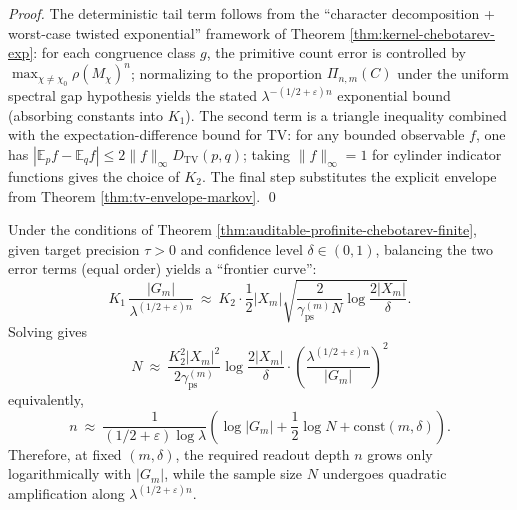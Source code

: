 \begin{proof}
The deterministic tail term follows from the ``character decomposition + worst-case twisted exponential'' framework of Theorem \ref{thm:kernel-chebotarev-exp}: for each congruence class \(g\), the primitive count error is controlled by \(\max_{\chi\ne\chi_0}\rho(M_\chi)^n\); normalizing to the proportion \(\Pi_{n,m}(C)\) under the uniform spectral gap hypothesis yields the stated \(\lambda^{-(1/2+\varepsilon)n}\) exponential bound (absorbing constants into \(K_1\)).
The second term is a triangle inequality combined with the expectation-difference bound for TV: for any bounded observable \(f\), one has \(|\mathbb{E}_p f-\mathbb{E}_q f|\le 2\|f\|_\infty D_{\mathrm{TV}}(p,q)\); taking \(\|f\|_\infty=1\) for cylinder indicator functions gives the choice of \(K_2\).
The final step substitutes the explicit envelope from Theorem \ref{thm:tv-envelope-markov}. \qed
\end{proof}

\begin{corollary}\label{cor:auditable-profinite-chebotarev-tradeoff}
Under the conditions of Theorem \ref{thm:auditable-profinite-chebotarev-finite}, given target precision \(\tau>0\) and confidence level \(\delta\in(0,1)\), balancing the two error terms (equal order) yields a ``frontier curve'':
\[
K_1\,\frac{|G_m|}{\lambda^{(1/2+\varepsilon)n}}
\ \approx\
K_2\cdot \frac12|X_m|\sqrt{\frac{2}{\gamma_{\mathrm{ps}}^{(m)}N}\log\frac{2|X_m|}{\delta}}.
\]
Solving gives
\[
\boxed{\;
N\ \approx\
\frac{K_2^2|X_m|^2}{2\gamma_{\mathrm{ps}}^{(m)}}\log\frac{2|X_m|}{\delta}\cdot
\left(\frac{\lambda^{(1/2+\varepsilon)n}}{|G_m|}\right)^2
\;}
\]
equivalently,
\[
\boxed{\;
n\ \approx\
\frac{1}{(1/2+\varepsilon)\log\lambda}\left(\log|G_m|+\frac12\log N+\mathrm{const}(m,\delta)\right).
\;}
\]
Therefore, at fixed \((m,\delta)\), the required readout depth \(n\) grows only logarithmically with \(|G_m|\), while the sample size \(N\) undergoes quadratic amplification along \(\lambda^{(1/2+\varepsilon)n}\).
\end{corollary}

